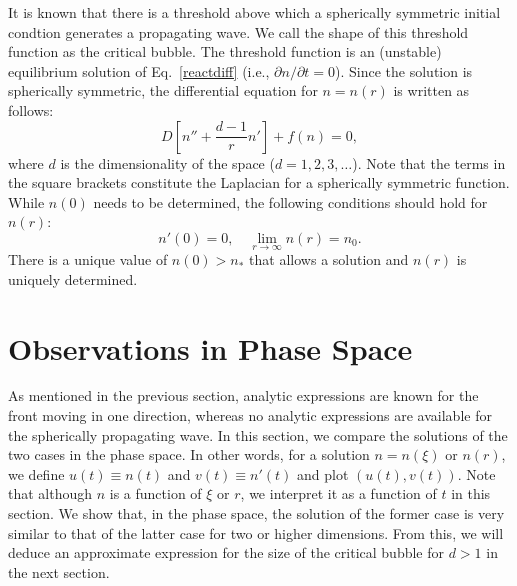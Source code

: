 \documentclass{article}
\begin{document}
It is known that there is a threshold above which a spherically symmetric initial condtion generates a propagating wave.
We call the shape of this threshold function as the critical bubble.
The threshold function is an (unstable) equilibrium solution of Eq.~\eqref{reactdiff} (i.e., $\partial n /\partial t=0$).
Since the solution is spherically symmetric, the differential equation for $n=n(r)$ is written as follows:
\begin{equation}
D\left[n''+\frac{d-1}{r}n'\right]+f(n)=0,
\end{equation}
where $d$ is the dimensionality of the space ($d=1,2,3,\dots$).
Note that the terms in the square brackets constitute the Laplacian for a spherically symmetric function.
While $n(0)$ needs to be determined, the following conditions should hold for $n(r)$:
\begin{equation}
n'(0)=0,\quad\lim_{r\rightarrow\infty}n(r)=n_0.
\end{equation}
There is a unique value of $n(0)>n_*$ that allows a solution and $n(r)$ is uniquely determined.

\section{Observations in Phase Space}

As mentioned in the previous section, analytic expressions are known for the front moving in one direction, whereas no analytic expressions are available for the spherically propagating wave.
In this section, we compare the solutions of the two cases in the phase space.
In other words, for a solution $n=n(\xi)$ or $n(r)$, we define $u(t)\equiv n(t)$ and $v(t)\equiv n'(t)$ and plot $(u(t),v(t))$. 
Note that although $n$ is a function of $\xi$ or $r$, we interpret it as a function of $t$ in this section.
We show that, in the phase space, the solution of the former case is very similar to that of the latter case for two or higher dimensions.
From this, we will deduce an approximate expression for the size of the critical bubble for $d>1$ in the next section.
\end{document}
